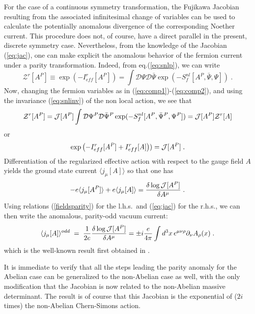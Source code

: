\documentclass[a4paper,12pt]{article}
\begin{document}
For the case of a continuous symmetry transformation, the Fujikawa
Jacobian resulting from the associated infinitesimal 
change of variables
can be used to calculate the potentially anomalous divergence of the corresponding
Noether current. This procedure does not, of course, have a direct
parallel in the present, discrete symmetry case.  Nevertheless, from
the knowledge of the Jacobian (\ref{eq:jac}), one can make explicit
the anomalous behavior of the fermion current under a parity
transformation. Indeed, from eq.(\ref{eq:snlp}), we can write
\begin{equation}
\mathcal{Z}^r[A^P]\equiv \exp\left(-I_{eff}^r[A^P]\right)
=\int\mathcal{D}\Psi\mathcal{D}\bar{\Psi} 
\exp(- S_f^{nl}[A^P,\bar \Psi, \Psi]) \;.
\label{ap}
\end{equation}
Now, changing the fermion variables as in
(\ref{eq:comp1})-(\ref{eq:comp2}), and using the invariance
(\ref{eq:snlinv}) of the non local action, we see that
\begin{equation}
\mathcal{Z}^r[A^P]={\cal J}[A^P]\int\mathcal{D}\Psi^P\mathcal{D}\bar{\Psi}^P 
\exp(- S_f^{nl}[A^P,\bar \Psi^P, \Psi^P]) = {\mathcal J}[A^P]
\mathcal{Z}^r[A]
\label{apf}
\end{equation}
or
\begin{equation}
\exp\left(-I_{eff}^r[A^P] + I_{eff}^r[A]\right)) = {\cal J}[A^P] \;.
\label{ac2}
\end{equation}
%
Differentiation of the regularized effective action with respect
to the gauge field $A$ yields the ground state current $\langle
j_\mu[A] \rangle$ so that one has
%
\begin{equation}
-e\langle j_\mu[A^P] \rangle + e\langle j_\mu[A] \rangle= 
\frac{\delta \log {\cal J}[A^P]}{\delta A^\mu} \;.
\end{equation}
%
Using relations (\ref{fieldsparity}) for the l.h.s.\ and (\ref{eq:jac})
for the r.h.s., we can then write the anomalous, parity-odd vacuum
current:
%
\begin{equation}
\langle j_\mu [A] \rangle^{odd} \;=\; \frac{1}{2e}  
\frac{\delta \log {\cal J}[A^P]}{\delta A^\mu} =
\pm i\frac{e}{4\pi}
\int d^3x\,\epsilon^{\mu\nu\rho}
  \partial_{\nu} A_{\rho}(x) \;.
\end{equation}
which is the well-known result first obtained in 
\cite{RedlichL}.

It is immediate to verify that all the steps leading the parity
anomaly for the Abelian case can be generalized to the non-Abelian
case as well, with the only modification that the Jacobian is now
related to the non-Abelian massive determinant.  The result is of
course that this Jacobian is the exponential of ($2 i$ times) the
non-Abelian Chern-Simons action.
\end{document}
